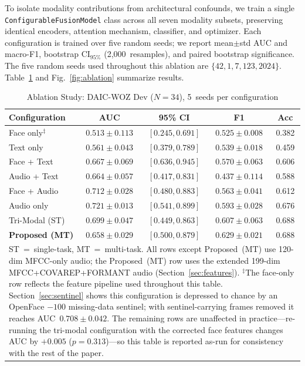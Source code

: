 \documentclass[5p,twocolumn]{elsarticle}
\begin{document}
To isolate modality contributions from architectural confounds, we
train a single \texttt{ConfigurableFusionModel} class across all seven
modality subsets, preserving identical encoders, attention mechanism,
classifier, and optimizer. Each configuration is trained over five
random seeds; we report mean$\pm$std AUC and macro-F1, bootstrap
$\text{CI}_{95\%}$ (2,000~resamples), and paired bootstrap significance.
The five random seeds used throughout this ablation are
$\{42, 1, 7, 123, 2024\}$. Table~\ref{tab:ablation} and
Fig.~\ref{fig:ablation} summarize results.

\begin{table}[t]
\centering
\renewcommand{\arraystretch}{1.15}
\caption{Ablation Study: DAIC-WOZ Dev ($N{=}34$), 5~seeds per configuration}
\label{tab:ablation}
\scriptsize
\setlength{\tabcolsep}{1.5pt}
\begin{tabular}{lcccc}
\toprule
\textbf{Configuration} & \textbf{AUC} & \textbf{95\% CI} & \textbf{F1} & \textbf{Acc} \\
\midrule
Face only$^{\ddagger}$ & $0.513\pm0.113$ & $[0.245,0.691]$ & $0.525\pm0.008$ & 0.382 \\
Text only         & $0.561\pm0.043$ & $[0.379,0.789]$ & $0.539\pm0.018$ & 0.459 \\
Face + Text       & $0.667\pm0.069$ & $[0.636,0.945]$ & $0.570\pm0.063$ & 0.606 \\
Audio + Text      & $0.664\pm0.057$ & $[0.417,0.831]$ & $0.437\pm0.114$ & 0.588 \\
Face + Audio      & $0.712\pm0.028$ & $[0.480,0.883]$ & $0.563\pm0.041$ & 0.612 \\
Audio only        & $\mathbf{0.721\pm0.013}$ & $[0.541,0.899]$ & $0.593\pm0.028$ & 0.676 \\
Tri-Modal (ST)    & $0.699\pm0.047$ & $[0.449,0.863]$ & $0.607\pm0.063$ & 0.688 \\
\midrule
\textbf{Proposed (MT)} & $0.658\pm0.029$ & $[0.500,0.879]$
  & $\mathbf{0.629\pm0.021}$ & $\mathbf{0.688}$ \\
\bottomrule
\multicolumn{5}{p{0.95\columnwidth}}{\scriptsize ST~=~single-task,
MT~=~multi-task. All rows except Proposed~(MT) use 120-dim
MFCC-only audio; the Proposed~(MT) row uses the extended 199-dim
MFCC+COVAREP+FORMANT audio (Section~\ref{sec:features}).
$^{\ddagger}$The
face-only row reflects the feature pipeline used throughout this table.
Section~\ref{sec:sentinel} shows this configuration is depressed to chance
by an OpenFace $-100$ missing-data sentinel; with sentinel-carrying frames
removed it reaches AUC~$0.708\pm0.042$. The remaining rows are unaffected
in practice---re-running the tri-modal configuration with the corrected
face features changes AUC by $+0.005$ ($p{=}0.313$)---so this table is
reported as-run for consistency with the rest of the paper.} \\
\end{tabular}
\end{table}
\end{document}
